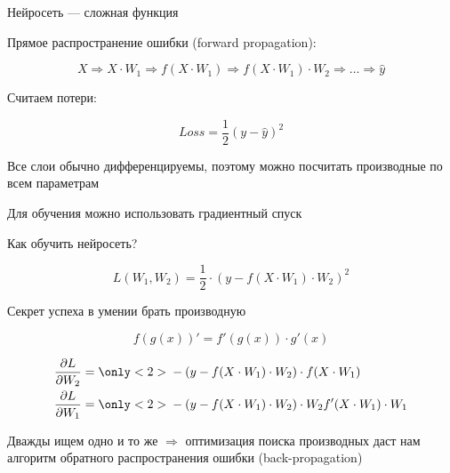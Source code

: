 \documentclass[notes,12pt, aspectratio=169]{beamer}
\newenvironment{wideitemize}{\itemize\addtolength{\itemsep}{10pt}}{\enditemize}
\begin{document}
\begin{frame}{Нейросеть —  сложная функция}
	\begin{wideitemize}
	\item Прямое распространение ошибки (forward propagation): 
	
	\[ X \Rightarrow X \cdot W_1 \Rightarrow f(X \cdot W_1) \Rightarrow f(X \cdot W_1) \cdot W_2 \Rightarrow \ldots \Rightarrow \hat{y} \]
	
	\item Считаем потери:
	
	\[Loss = \frac{1}{2} (y - \hat y)^2\]
	
	\item Все слои обычно дифференцируемы, поэтому можно посчитать производные по всем параметрам
	
	\item Для обучения можно использовать градиентный спуск
	\end{wideitemize}
\end{frame}


\begin{frame}{Как обучить нейросеть?}

\[ L(W_1, W_2) =  \frac{1}{2} \cdot (y - f(X \cdot W_1) \cdot W_2)^2\]

\begin{center}
\alert{Секрет успеха в умении брать производную}
\end{center}

\pause

\[ \boxed{ f(g(x))' = f'(g(x)) \cdot g'(x) }  \]

\pause

\begin{equation*} 
\begin{aligned} 
\frac{\partial L}{\partial W_2} &=   { \only<2>{ \color{red}} - (y - f(X \cdot W_1) \cdot W_2) } \cdot f(X \cdot W_1) \\
\frac{\partial L}{\partial W_1} &= { \only<2>{ \color{red}}  - (y - f(X \cdot W_1) \cdot W_2) } \cdot W_2 f'(X \cdot W_1) \cdot W_1 
\end{aligned}
\end{equation*}

\vfill

\pause

\alert{Дважды ищем одно и то же $\Rightarrow$ оптимизация поиска производных даст нам алгоритм обратного распространения ошибки (back-propagation)}
\end{frame}
\end{document}
